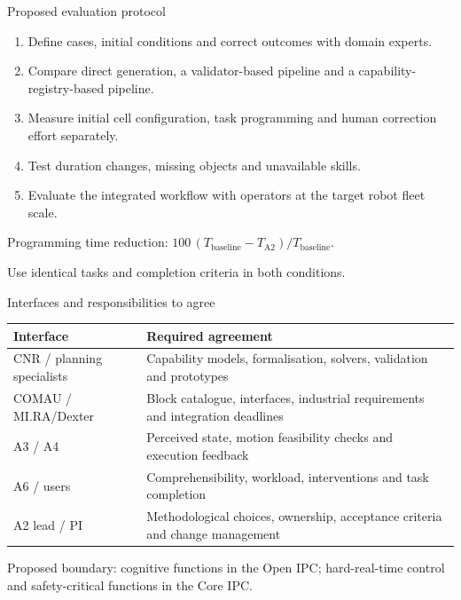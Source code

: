 \documentclass[aspectratio=169,11pt]{beamer}
\begin{document}
\begin{frame}{Proposed evaluation protocol}
\begin{enumerate}\items
\item Define cases, initial conditions and correct outcomes with domain experts.
\item Compare direct generation, a validator-based pipeline and a capability-registry-based pipeline.
\item Measure initial cell configuration, task programming and human correction effort separately.
\item Test duration changes, missing objects and unavailable skills.
\item Evaluate the integrated workflow with operators at the target robot fleet scale.
\end{enumerate}
\small
Programming time reduction: $100\,(T_{\mathrm{baseline}}-T_{\mathrm{A2}})/T_{\mathrm{baseline}}$.\par
Use identical tasks and completion criteria in both conditions.
\end{frame}

\begin{frame}{Interfaces and responsibilities to agree}
\small\renewcommand{\arraystretch}{1.2}
\begin{tabularx}{\textwidth}{@{}>{\raggedright\arraybackslash}p{}X@{}}
\toprule
Interface & Required agreement\\\midrule
CNR / planning specialists & Capability models, formalisation, solvers, validation and prototypes\\
COMAU / MI.RA/Dexter & Block catalogue, interfaces, industrial requirements and integration deadlines\\
A3 / A4 & Perceived state, motion feasibility checks and execution feedback\\
A6 / users & Comprehensibility, workload, interventions and task completion\\
A2 lead / PI & Methodological choices, ownership, acceptance criteria and change management\\\bottomrule
\end{tabularx}
\par\vspace{3mm}
Proposed boundary: cognitive functions in the Open IPC; hard-real-time control and safety-critical functions in the Core IPC.
\end{frame}
\end{document}
